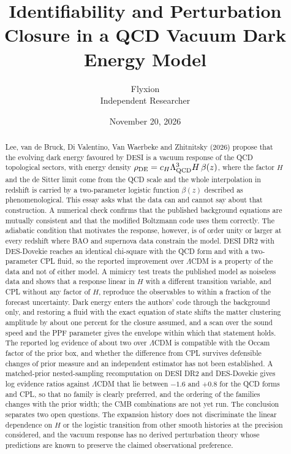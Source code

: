 \documentclass[11pt]{article}
\title{Identifiability and Perturbation Closure in a QCD Vacuum Dark Energy Model}
\author{Flyxion\\Independent Researcher}
\date{November 20, 2026}
\newcommand{\LQCD}{\Lambda_{\rm QCD}}
\begin{document}
\maketitle

\begin{abstract}
Lee, van de Bruck, Di Valentino, Van Waerbeke and Zhitnitsky (2026) propose that the evolving dark energy favoured by DESI is a vacuum response of the QCD topological sectors, with energy density $\rho_{\rm DE}=c_H\LQCD^3 H\,\beta(z)$, where the factor $H$ and the de Sitter limit come from the QCD scale and the whole interpolation in redshift is carried by a two-parameter logistic function $\beta(z)$ described as phenomenological. This essay asks what the data can and cannot say about that construction. A numerical check confirms that the published background equations are mutually consistent and that the modified Boltzmann code uses them correctly. The adiabatic condition that motivates the response, however, is of order unity or larger at every redshift where BAO and supernova data constrain the model. DESI DR2 with DES-Dovekie reaches an identical chi-square with the QCD form and with a two-parameter CPL fluid, so the reported improvement over $\Lambda$CDM is a property of the data and not of either model. A mimicry test treats the published model as noiseless data and shows that a response linear in $H$ with a different transition variable, and CPL without any factor of $H$, reproduce the observables to within a fraction of the forecast uncertainty. Dark energy enters the authors' code through the background only, and restoring a fluid with the exact equation of state shifts the matter clustering amplitude by about one percent for the closure assumed, and a scan over the sound speed and the PPF parameter gives the envelope within which that statement holds. The reported log evidence of about two over $\Lambda$CDM is compatible with the Occam factor of the prior box, and whether the difference from CPL survives defensible changes of prior measure and an independent estimator has not been established. A matched-prior nested-sampling recomputation on DESI DR2 and DES-Dovekie gives log evidence ratios against $\Lambda$CDM that lie between $-1.6$ and $+0.8$ for the QCD forms and CPL, so that no family is clearly preferred, and the ordering of the families changes with the prior width; the CMB combinations are not yet run. The conclusion separates two open questions. The expansion history does not discriminate the linear dependence on $H$ or the logistic transition from other smooth histories at the precision considered, and the vacuum response has no derived perturbation theory whose predictions are known to preserve the claimed observational preference.
\end{abstract}
\end{document}
